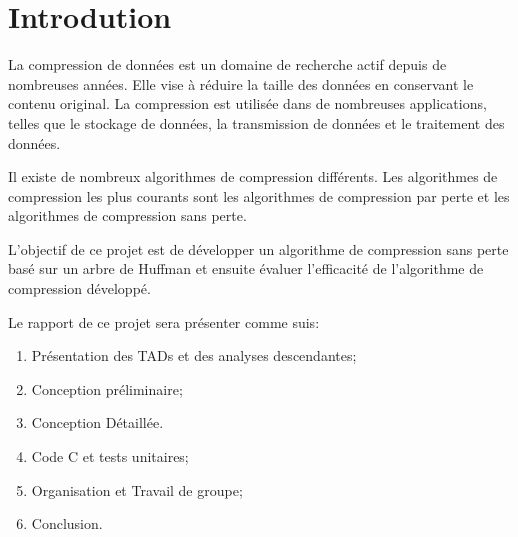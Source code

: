 \section{Introdution}
	La compression de données est un domaine de recherche actif depuis de nombreuses années. Elle vise à réduire la taille des données en conservant le contenu original. La compression est utilisée dans de nombreuses applications, telles que le stockage de données, la transmission de données et le traitement des données.

Il existe de nombreux algorithmes de compression différents. Les algorithmes de compression les plus courants sont les algorithmes de compression par perte et les algorithmes de compression sans perte.

L'objectif de ce projet est de développer un algorithme de compression sans perte basé sur un arbre de Huffman et ensuite évaluer l'efficacité de l'algorithme de compression développé.
 
 Le rapport de ce projet sera présenter comme suis:
 
\begin{enumerate}
\item Présentation des TADs et des analyses descendantes;
\item Conception préliminaire;
\item Conception Détaillée.
\item Code C et tests unitaires;
\item Organisation et Travail de groupe;
\item Conclusion.
\end{enumerate}

